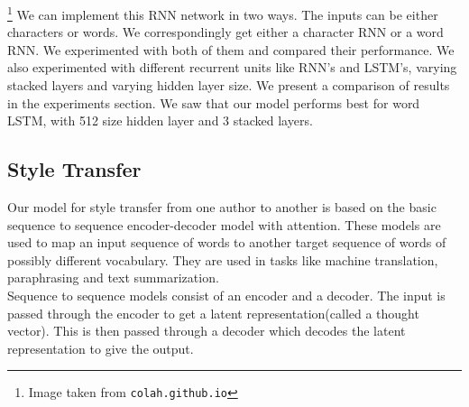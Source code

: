 \documentclass{article} %
\begin{document}
  \footnote{Image taken from \texttt{colah.github.io}}
We can implement this RNN network in two ways. The inputs can be either characters or words. We correspondingly get either a character RNN or a word RNN. We experimented with both of them and compared their performance.
We also experimented with different recurrent units like RNN's and LSTM's, varying stacked layers and varying hidden layer size. We present a comparison of results in the experiments section. We saw that our model performs best for word LSTM, with 512 size hidden layer and 3 stacked layers.

\subsection{Style Transfer}
Our model for style transfer from one author to another is based on the basic sequence to sequence encoder-decoder model with attention. These models are used to map an input sequence of words to another target sequence of words of possibly different vocabulary. They are used in tasks like machine translation, paraphrasing and text summarization.\\
Sequence to sequence models consist of an encoder and a decoder. The input is passed through the encoder to get a latent representation(called a thought vector). This is then passed through a decoder which decodes the latent representation to give the output.
\end{document}
